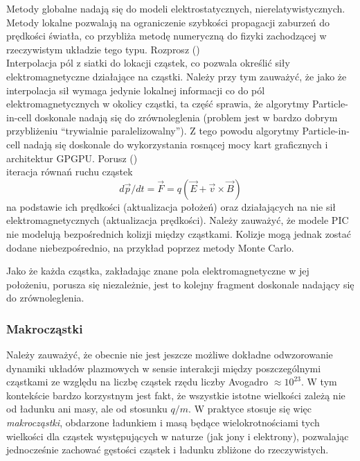 \begin{itemize}
    Metody globalne nadają się do modeli elektrostatycznych,
    nierelatywistycznych.  Metody lokalne pozwalają na ograniczenie szybkości
    propagacji zaburzeń do prędkości światła, co przybliża metodę numeryczną do
    fizyki zachodzącej w rzeczywistym układzie tego typu.
    \itemi{} Rozprosz () \\
    Interpolacja pól z siatki do lokacji cząstek, co pozwala określić siły
    elektromagnetyczne działające na cząstki.  Należy przy tym zauważyć, że
    jako że interpolacja sił wymaga jedynie lokalnej informacji co do pól
    elektromagnetycznych w okolicy cząstki, ta część sprawia, że
    algorytmy Particle-in-cell doskonale nadają się do zrównoleglenia (problem
    jest w bardzo dobrym przybliżeniu ``trywialnie paralelizowalny''). Z tego
    powodu algorytmy Particle-in-cell nadają się doskonale do wykorzystania
    rosnącej mocy kart graficznych i architektur GPGPU\@.
    \itemi{} Porusz () \\
    iteracja równań ruchu cząstek
    \begin{equation}
        d \vec{p}/dt = \vec{F} = q (\vec{E} + \vec{v} \times \vec{B})
        \label{eq-of-motion}
    \end{equation}
    na podstawie ich prędkości (aktualizacja położeń) oraz działających na nie
    sił elektromagnetycznych (aktualizacja prędkości). Należy zauważyć, że
    modele PIC nie modelują bezpośrednich kolizji między cząstkami. Kolizje
    mogą jednak zostać dodane niebezpośrednio, na przykład poprzez metody Monte
    Carlo.

    Jako że każda cząstka, zakładając znane pola elektromagnetyczne w jej
    położeniu, porusza się niezależnie, jest to kolejny fragment doskonale
    nadający się do zrównoleglenia.
    \end{itemize}
    \subsubsection{Makrocząstki}
    Należy zauważyć, że obecnie nie jest jeszcze możliwe dokładne odwzorowanie
    dynamiki układów plazmowych w sensie interakcji między poszczególnymi
    cząstkami ze względu na liczbę cząstek rzędu liczby Avogadro $\approx
    10^{23}$.  W tym kontekście bardzo korzystnym jest fakt, że wszystkie
    istotne wielkości zależą nie od ładunku ani masy, ale od stosunku $q/m$. W
    praktyce stosuje się więc \emph{makrocząstki}, obdarzone ładunkiem i masą
    będące wielokrotnościami tych wielkości dla cząstek występujących w naturze
    (jak jony i elektrony), pozwalając jednocześnie zachować gęstości cząstek i
    ładunku zbliżone do rzeczywistych.

